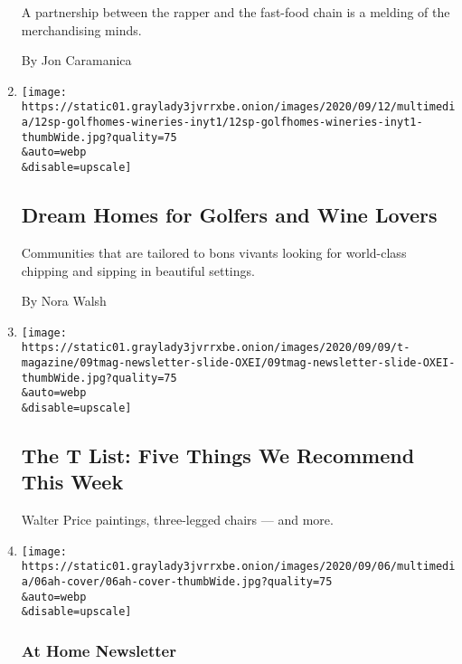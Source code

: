 \begin{enumerate}
  A partnership between the rapper and the fast-food chain is a melding
  of the merchandising minds.

  By Jon Caramanica
\item
  \href{/2020/09/11/realestate/golf-homes-community-wineries.html}{}

  \texttt{[image: https://static01.graylady3jvrrxbe.onion/images/2020/09/12/multimedia/12sp-golfhomes-wineries-inyt1/12sp-golfhomes-wineries-inyt1-thumbWide.jpg?quality=75\\\&auto=webp\\\&disable=upscale]}

  \hypertarget{dream-homes-for-golfers-and-wine-lovers}{%
  \subsection{Dream Homes for Golfers and Wine
  Lovers}\label{dream-homes-for-golfers-and-wine-lovers}}

  Communities that are tailored to bons vivants looking for world-class
  chipping and sipping in beautiful settings.

  By Nora Walsh
\item
  \href{/2020/09/10/t-magazine/walter-price-babka-zana.html}{}

  \texttt{[image: https://static01.graylady3jvrrxbe.onion/images/2020/09/09/t-magazine/09tmag-newsletter-slide-OXEI/09tmag-newsletter-slide-OXEI-thumbWide.jpg?quality=75\\\&auto=webp\\\&disable=upscale]}

  \hypertarget{the-t-list-five-things-we-recommend-this-week}{%
  \subsection{The T List: Five Things We Recommend This
  Week}\label{the-t-list-five-things-we-recommend-this-week}}

  Walter Price paintings, three-legged chairs --- and more.
\item
  \href{/2020/09/09/at-home/newsletter.html}{}

  \texttt{[image: https://static01.graylady3jvrrxbe.onion/images/2020/09/06/multimedia/06ah-cover/06ah-cover-thumbWide.jpg?quality=75\\\&auto=webp\\\&disable=upscale]}

  \hypertarget{at-home-newsletter-1}{%
  \subsubsection{At Home Newsletter}\label{at-home-newsletter-1}}

  \hypertarget{endless-summer-vs-hurry-up-fall}{%
}
\end{enumerate}
